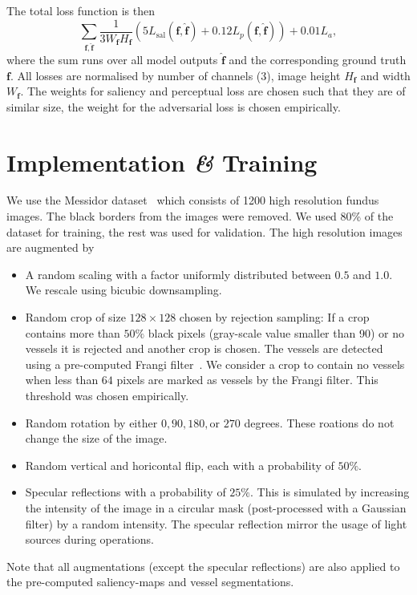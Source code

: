 \documentclass{scrartcl}
\newcommand{\img}{\bm{f}} %
\begin{document}
The total loss function is then
\begin{equation}
  \label{eq:total-loss}
\sum_{\img, \hat{\img}}
\frac{1}{3 W_{\img} H_{\img}}
  \left( 5 L_{\text{sal}} (\img, \hat{\img}) + 0.12  L_p(\img, \hat{\img}) \right) + 0.01 L_a,
\end{equation}
where the sum runs over all model outputs \(\hat{\img}\) and the corresponding ground truth \(\img\).
All losses are normalised by number of channels (3), image height \(H_{\img}\) and width \(W_{\img}\).
The weights for saliency and perceptual loss are chosen such that they are of similar size, the weight for the adversarial loss is chosen empirically.

\section{Implementation \textit{\&} Training}
We use the Messidor dataset~\cite{Messidor} which consists of 1200 high resolution fundus images.
The black borders from the images were removed.
We used 80\% of the dataset for training, the rest was used for validation.
The high resolution images are augmented by
\begin{itemize}
\item A random scaling with a factor uniformly distributed between $0.5$ and $1.0$.
  We rescale using bicubic downsampling.
\item Random crop of size $128 \times 128$ chosen by rejection sampling:
If a crop contains more than $50\%$ black pixels (gray-scale value smaller than 90) or no vessels it is rejected and another crop is chosen.
The vessels are detected using a pre-computed Frangi filter~\cite{Frangi}.
We consider a crop to contain no vessels when less than $64$ pixels are marked as vessels by the Frangi filter.
This threshold was chosen empirically.
\item Random rotation by either $0, 90, 180, \text{or } 270$ degrees.
  These roations do not change the size of the image.
\item Random vertical and horicontal flip, each with a probability of $50\%$.
\item Specular reflections with a probability of $25\%$.
This is simulated by increasing the intensity of the image in a circular mask (post-processed with a Gaussian filter) by a random intensity.
The specular reflection mirror the usage of light sources during operations.
\end{itemize}
Note that all augmentations (except the specular reflections) are also applied to the pre-computed saliency-maps and vessel segmentations.
\end{document}
